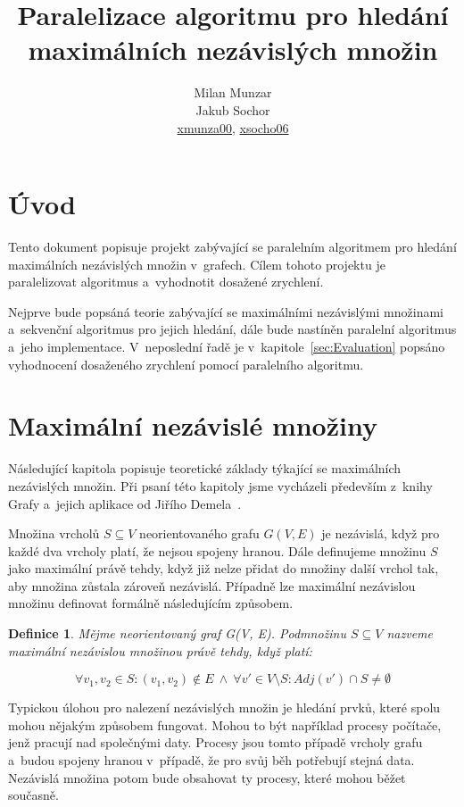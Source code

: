 \documentclass[12pt]{article}
\title{Paralelizace algoritmu pro hledání maximálních nezávislých množin}
\author{Milan Munzar\\
Jakub Sochor\\
\normalsize{\url{xmunza00}, \url{xsocho06} }}
\date{}
\newtheorem{definition}{Definice}
\begin{document}
\maketitle

\section{Úvod}
Tento dokument popisuje projekt zabývající se paralelním algoritmem pro hledání maximálních nezávislých množin v~grafech. Cílem tohoto projektu je paralelizovat algoritmus a~vyhodnotit dosažené zrychlení.

Nejprve bude popsáná teorie zabývající se maximálními nezávislými množinami a~sekvenční algoritmus pro jejich hledání, dále bude nastíněn paralelní algoritmus a~jeho implementace. V~neposlední řadě je v~kapitole~\ref{sec:Evaluation} popsáno vyhodnocení dosaženého zrychlení pomocí paralelního algoritmu.



\section{Maximální nezávislé množiny}

Následující kapitola popisuje teoretické základy týkající se maximálních nezávislých množin. Při psaní této kapitoly jsme vycházeli především z~knihy Grafy a~jejich aplikace od Jiřího Demela~\cite{demel}.

Množina vrcholů $S \subseteq V$ neorientovaného grafu $G(V,E)$ je nezávislá, když pro každé dva vrcholy platí, že nejsou spojeny hranou. Dále definujeme množinu $S$ jako maximální právě tehdy, když již nelze přidat do množiny další vrchol tak, aby množina zůstala zároveň nezávislá. Případně lze maximální nezávislou množinu definovat formálně následujícím způsobem.

\begin{definition}
Mějme neorientovaný graf G(V, E). Podmnožinu $S \subseteq V$ nazveme maximální nezávislou množinou právě tehdy, když platí:

\begin{equation*}
\forall v_1, v_2 \in S: (v_1, v_2) \notin E\ \wedge\ \forall v' \in V \setminus S: Adj(v') \cap S \neq \emptyset
\end{equation*}



\end{definition}


Typickou úlohou pro nalezení nezávislých množin je hledání prvků, které spolu mohou nějakým způsobem fungovat. Mohou to být například procesy počítače, jenž pracují nad společnými daty. Procesy jsou tomto případě vrcholy grafu a~budou spojeny hranou v~případě, že pro svůj běh potřebují stejná data. Nezávislá množina potom bude obsahovat ty procesy, které mohou běžet současně.
\end{document}
